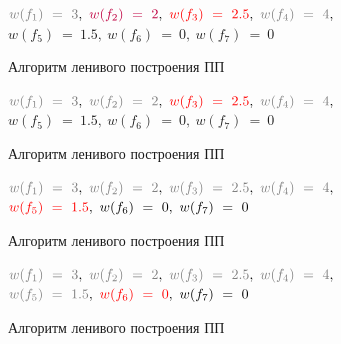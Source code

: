 \documentclass[utf8]{beamer}
\begin{document}
\begin{frame}
	\begin{exampleblock}{}
		\begin{center} 
				${\color{gray}w(f_1)\ =\ 3},\ {\color{purple}w(f_2)\ =\ 2},\
				{\color{red}w(f_3)\ =\ 2.5},\ {\color{gray}w(f_4)\ =\ 4},$ \\$w(f_5)\ =\ 1.5,\ w(f_6)\ =\ 0,\ w(f_7)\ =\
				0$
		\end{center}  
	\end{exampleblock}
	\begin{block}{Алгоритм ленивого построения ПП}
		\picLazyCFifth                    
	\end{block}
\end{frame}

\begin{frame}
	\begin{exampleblock}{}
		\begin{center} 
				${\color{gray}w(f_1)\ =\ 3},\ {\color{gray}w(f_2)\ =\ 2},\
				{\color{red}w(f_3)\ =\ 2.5},\ {\color{gray}w(f_4)\ =\ 4},$ \\$w(f_5)\ =\ 1.5,\ w(f_6)\ =\ 0,\ w(f_7)\ =\
				0$
		\end{center}  
	\end{exampleblock}
	\begin{block}{Алгоритм ленивого построения ПП}
		\picLazyCSixth                    
	\end{block}
\end{frame}

\begin{frame}
	\begin{exampleblock}{}
		\begin{center} 
				
				${\color{gray}w(f_1)\ =\ 3},\ {\color{gray}w(f_2)\ =\ 2},\
				{\color{gray}w(f_3)\ =\ 2.5},\ {\color{gray}w(f_4)\ =\ 4},$ 
				\\${\color{red}w(f_5)\ =\ 1.5},\ w(f_6)\ =\ 0,\ w(f_7)\ =\
				0$
		\end{center}  
	\end{exampleblock}
	\begin{block}{Алгоритм ленивого построения ПП}
		\picLazyCSeventh                     
	\end{block}
\end{frame}

\begin{frame}
	\begin{exampleblock}{}
		\begin{center} 
				
				${\color{gray}w(f_1)\ =\ 3},\ {\color{gray}w(f_2)\ =\ 2},\
				{\color{gray}w(f_3)\ =\ 2.5},\ {\color{gray}w(f_4)\ =\ 4},$ 
				\\${\color{gray}w(f_5)\ =\ 1.5},\ {\color{red}w(f_6)\ =\ 0},\ w(f_7)\ =\
				0$
		\end{center}  
	\end{exampleblock}
	\begin{block}{Алгоритм ленивого построения ПП}
		\picLazyCEigth                      
	\end{block}
\end{frame}
\end{document}
